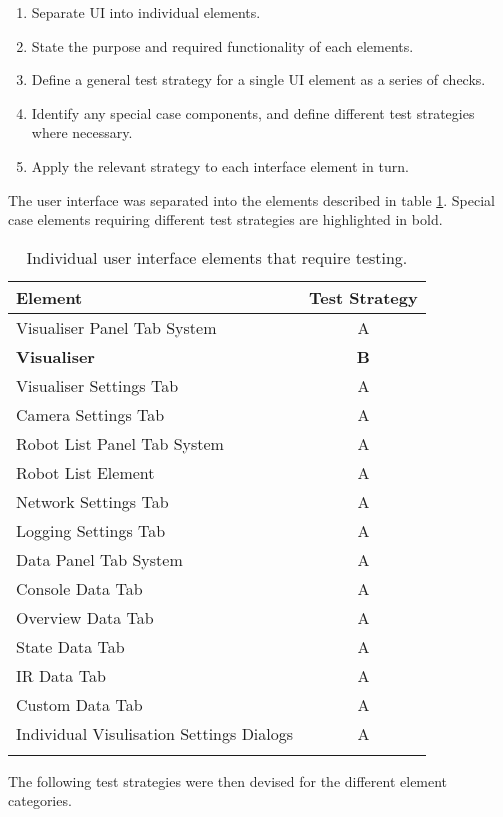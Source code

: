 \begin{enumerate}
 \item Separate UI into individual elements.
 \item State the purpose and required functionality of each elements.
 \item Define a general test strategy for a single UI element as a series of checks.
 \item Identify any special case components, and define different test strategies where necessary.
 \item Apply the relevant strategy to each interface element in turn.
\end{enumerate}

\vspace{0.5cm}

The user interface was separated into the elements described in table \ref{tab:UserInterfaceElements}. Special case elements requiring different test strategies are highlighted in bold.

\begin{longtable}{ l c }
\caption[User Interface Elements]{Individual user interface elements that require testing.}\\
 Element & Test Strategy\\
 \hline
 Visualiser Panel Tab System & A \\
 \textbf{Visualiser} & \textbf{B} \\
 Visualiser Settings Tab & A \\
 Camera Settings Tab & A \\
 Robot List Panel Tab System & A \\
 Robot List Element & A \\
 Network Settings Tab & A \\
 Logging Settings Tab & A \\
 Data Panel Tab System & A \\
 Console Data Tab & A \\
 Overview Data Tab & A \\
 State Data Tab & A \\
 IR Data Tab & A \\
 Custom Data Tab & A \\
 Individual Visulisation Settings Dialogs & A \\
 \bottomrule
 \label{tab:UserInterfaceElements}
\end{longtable}

The following test strategies were then devised for the different element categories.

